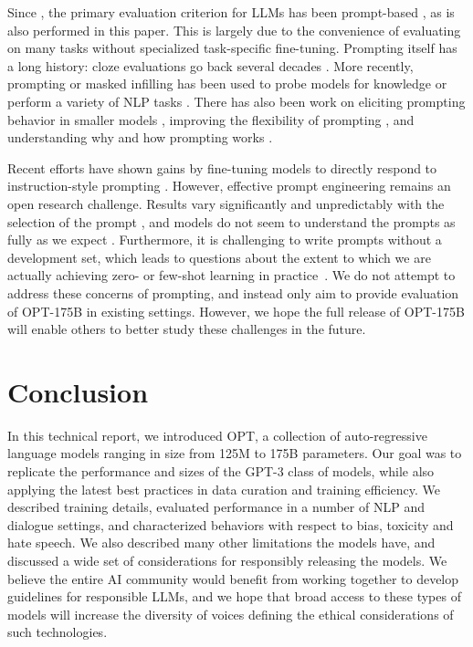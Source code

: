 \documentclass[11pt]{article}
\newcommand{\OPT}[0]{{OPT-175B}}
\begin{document}
Since \citet{brown2020gpt3}, the primary evaluation criterion for LLMs has been prompt-based \cite{eleutherai2022,gopher2022,palm2022}, as is also performed in this paper. This is largely due to the convenience of evaluating on many tasks without specialized task-specific fine-tuning. Prompting itself has a long history: cloze evaluations go back several decades \cite{chambers-jurafsky-2008-unsupervised,storycloze}. More recently, prompting or masked infilling has been used to probe models for knowledge \cite{petroni2019language} or perform a variety of NLP tasks \cite{radford2019language, brown2020gpt3}.
There has also been work on eliciting prompting behavior in smaller models \cite{timopriming2020,gao2021,Li2021Prefix-Tuning:Generation,DBLP:journals/corr/abs-2104-08691,Scao2021HowWorth}, improving the flexibility of prompting \cite{Shin2020AutoPrompt}, and understanding why and how prompting works \cite{incontextgpt3_2021,min2022rethinking}. 

Recent efforts have shown gains by fine-tuning models to directly respond to instruction-style prompting \cite{flan2021,min2021metaicl,sanh2021multitask,ouyang2022training}. However, effective prompt engineering remains an open research challenge. Results vary significantly and unpredictably with the selection of the prompt  \cite{promptsensitivity2021}, and models do not seem to understand the prompts as fully as we expect \cite{webson2021prompt}. Furthermore, it is challenging to write prompts without a development set, which leads to questions about the extent to which we are actually achieving zero- or few-shot learning in practice~\cite{perez2021true}. We do not attempt to address these concerns of prompting, and instead only aim to provide evaluation of \OPT{} in existing settings. However, we hope the full release of \OPT{} will enable others to better study these challenges in the future.  \section{Conclusion}
\label{sec:conclusion}

In this technical report, we introduced OPT, a collection of auto-regressive language models ranging in size from 125M to 175B parameters. 
Our goal was to replicate the performance and sizes of the GPT-3 class of models, while also applying the latest best practices in data curation and training efficiency.
We described training details, evaluated performance in a number of NLP and dialogue settings, and characterized behaviors with respect to bias, toxicity and hate speech. We also described many other limitations the models have, and discussed a wide set of considerations for responsibly releasing the models. We believe the entire AI community would benefit from working together to develop guidelines for responsible LLMs, and we hope that broad access to these types of models will increase the diversity of voices defining the ethical considerations of such technologies.
\end{document}
